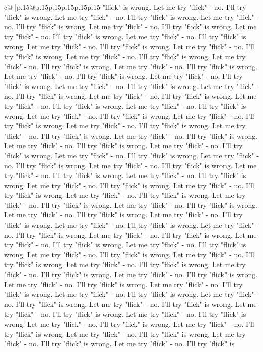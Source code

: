 \documentclass{article}
\begin{document}
{\begin{supertabular}{c@{$\;$}|p{.15\linewidth}@{}p{.15\linewidth}p{.15\linewidth}p{.15\linewidth}p{.15\linewidth}p{.15\linewidth}}
{{{"flick" is wrong. Let me try "flick" {-} no. I'll try "flick" is wrong. Let me try "flick" {-} no. I'll try "flick" is wrong. Let me try "flick" {-} no. I'll try "flick" is wrong. Let me try "flick" {-} no. I'll try "flick" is wrong. Let me try "flick" {-} no. I'll try "flick" is wrong. Let me try "flick" {-} no. I'll try "flick" is wrong. Let me try "flick" {-} no. I'll try "flick" is wrong. Let me try "flick" {-} no. I'll try "flick" is wrong. Let me try "flick" {-} no. I'll try "flick" is wrong. Let me try "flick" {-} no. I'll try "flick" is wrong. Let me try "flick" {-} no. I'll try "flick" is wrong. Let me try "flick" {-} no. I'll try "flick" is wrong. Let me try "flick" {-} no. I'll try "flick" is wrong. Let me try "flick" {-} no. I'll try "flick" is wrong. Let me try "flick" {-} no. I'll try "flick" is wrong. Let me try "flick" {-} no. I'll try "flick" is wrong. Let me try "flick" {-} no. I'll try "flick" is wrong. Let me try "flick" {-} no. I'll try "flick" is wrong. Let me try "flick" {-} no. I'll try "flick" is wrong. Let me try "flick" {-} no. I'll try "flick" is wrong. Let me try "flick" {-} no. I'll try "flick" is wrong. Let me try "flick" {-} no. I'll try "flick" is wrong. Let me try "flick" {-} no. I'll try "flick" is wrong. Let me try "flick" {-} no. I'll try "flick" is wrong. Let me try "flick" {-} no. I'll try "flick" is wrong. Let me try "flick" {-} no. I'll try "flick" is wrong. Let me try "flick" {-} no. I'll try "flick" is wrong. Let me try "flick" {-} no. I'll try "flick" is wrong. Let me try "flick" {-} no. I'll try "flick" is wrong. Let me try "flick" {-} no. I'll try "flick" is wrong. Let me try "flick" {-} no. I'll try "flick" is wrong. Let me try "flick" {-} no. I'll try "flick" is wrong. Let me try "flick" {-} no. I'll try "flick" is wrong. Let me try "flick" {-} no. I'll try "flick" is wrong. Let me try "flick" {-} no. I'll try "flick" is wrong. Let me try "flick" {-} no. I'll try "flick" is wrong. Let me try "flick" {-} no. I'll try "flick" is wrong. Let me try "flick" {-} no. I'll try "flick" is wrong. Let me try "flick" {-} no. I'll try "flick" is wrong. Let me try "flick" {-} no. I'll try "flick" is wrong. Let me try "flick" {-} no. I'll try "flick" is wrong. Let me try "flick" {-} no. I'll try "flick" is wrong. Let me try "flick" {-} no. I'll try "flick" is wrong. Let me try "flick" {-} no. I'll try "flick" is wrong. Let me try "flick" {-} no. I'll try "flick" is wrong. Let me try "flick" {-} no. I'll try "flick" is wrong. Let me try "flick" {-} no. I'll try "flick" is wrong. Let me try "flick" {-} no. I'll try "flick" is wrong. Let me try "flick" {-} no. I'll try "flick" is wrong. Let me try "flick" {-} no. I'll try "flick" is wrong. Let me try "flick" {-} no. I'll try "flick" is wrong. Let me try "flick" {-} no. I'll try "flick" is wrong. Let me try "flick" {-} no. I'll try "flick" is wrong. Let me try "flick" {-} no. I'll try "flick" is wrong. Let me try "flick" {-} no. I'll try "flick" is wrong. Let me try "flick" {-} no. I'll try "flick" is wrong. Let me try "flick" {-} no. I'll try "flick" is wrong. Let me try "flick" {-} no. I'll try "flick" is wrong. Let me try "flick" {-} no. I'll try "flick" is }}}
\end{supertabular}}
\end{document}
